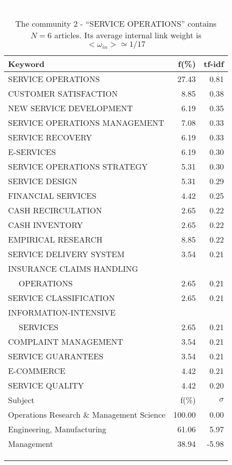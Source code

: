 \documentclass[a4paper,11pt]{report}
\begin{document}
\begin{landscape}
\clearpage

\begin{table}[!ht]
\caption{The community 2 - ``SERVICE OPERATIONS'' contains $N = 6$ articles. Its average internal link weight is $<\omega_{in}> \simeq 1/17$ }
\textcolor{white}{aa}\\
{\scriptsize\begin{tabular}{|l r  r|}
\hline
Keyword & f(\%) & tf-idf \\
\hline
SERVICE OPERATIONS & 27.43 & 0.81\\
CUSTOMER SATISFACTION & 8.85 & 0.38\\
NEW SERVICE DEVELOPMENT & 6.19 & 0.35\\
SERVICE OPERATIONS MANAGEMENT & 7.08 & 0.33\\
SERVICE RECOVERY & 6.19 & 0.33\\
E-SERVICES & 6.19 & 0.30\\
SERVICE OPERATIONS STRATEGY & 5.31 & 0.30\\
SERVICE DESIGN & 5.31 & 0.29\\
FINANCIAL SERVICES & 4.42 & 0.25\\
CASH RECIRCULATION & 2.65 & 0.22\\
CASH INVENTORY & 2.65 & 0.22\\
EMPIRICAL RESEARCH & 8.85 & 0.22\\
SERVICE DELIVERY SYSTEM & 3.54 & 0.21\\
INSURANCE CLAIMS HANDLING &  &\\
$\quad$ OPERATIONS & 2.65 & 0.21\\
SERVICE CLASSIFICATION & 2.65 & 0.21\\
INFORMATION-INTENSIVE &  &\\
$\quad$ SERVICES & 2.65 & 0.21\\
COMPLAINT MANAGEMENT & 3.54 & 0.21\\
SERVICE GUARANTEES & 3.54 & 0.21\\
E-COMMERCE & 4.42 & 0.21\\
SERVICE QUALITY & 4.42 & 0.20\\
\hline
\hline
Subject & f(\%) & $\sigma$\\
\hline
Operations Research \& Management Science & 100.00 & 0.00\\
Engineering, Manufacturing & 61.06 & 5.97\\
Management & 38.94 & -5.98\\
 &  & \\
 &  & \\
 &  & \\

\end{tabular}}
\end{table}
\end{landscape}
\end{document}
